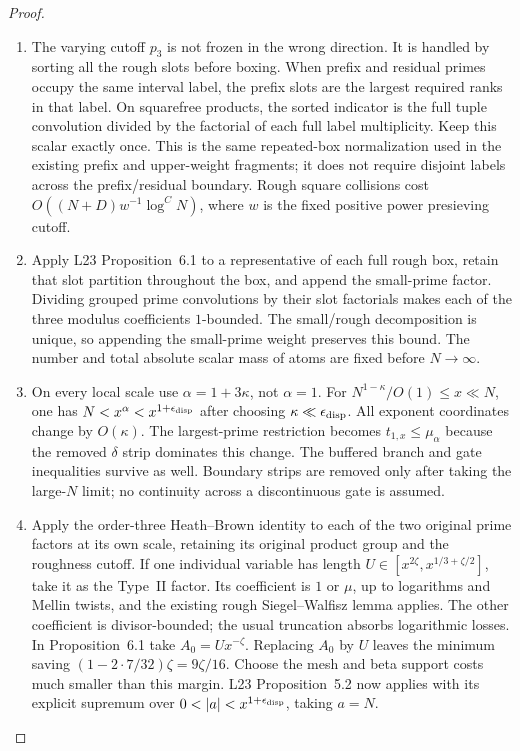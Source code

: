 \documentclass[11pt]{article}
\begin{document}
\begin{proof}
\begin{enumerate}
\item
The varying cutoff $p_3$ is not frozen in the wrong direction.
It is handled by sorting all the rough slots before boxing.
When prefix and residual primes occupy the same interval label,
the prefix slots are the largest required ranks in that label.
On squarefree products, the sorted indicator is the full tuple
convolution divided by the factorial of each full label
multiplicity. Keep this scalar exactly once. This is the same
repeated-box normalization used in the existing prefix and
upper-weight fragments; it does not require disjoint labels
across the prefix/residual boundary. Rough square collisions
cost $O((N+D)w^{-1}\log^C N)$, where $w$ is the fixed positive
power presieving cutoff.

\item
Apply L23 Proposition~6.1 to a representative of each full
rough box, retain that slot partition throughout the box, and
append the small-prime factor. Dividing grouped prime
convolutions by their slot factorials makes each of the three
modulus coefficients $1$-bounded. The small/rough decomposition
is unique, so appending the small-prime weight preserves this
bound. The number and total absolute scalar mass of atoms are
fixed before $N\to\infty$.

\item
On every local scale use $\alpha=1+3\kappa$, not $\alpha=1$.
For $N^{1-\kappa}/O(1)\le x\ll N$, one has
$N<x^\alpha<x^{1+\epsilon_{\rm disp}}$ after choosing
$\kappa\ll\epsilon_{\rm disp}$. All exponent coordinates
change by $O(\kappa)$. The largest-prime restriction becomes
$t_{1,x}\le\mu_\alpha$ because the removed $\delta$ strip
dominates this change. The buffered branch and gate inequalities
survive as well. Boundary strips are removed only after taking
the large-$N$ limit; no continuity across a discontinuous gate
is assumed.

\item
Apply the order-three Heath--Brown identity to each of the two
original prime factors at its own scale, retaining its original
product group and the roughness cutoff. If one individual
variable has length $U\in[x^{2\zeta},x^{1/3+\zeta/2}]$, take
it as the Type~II factor. Its coefficient is $1$ or $\mu$,
up to logarithms and Mellin twists, and the existing rough
Siegel--Walfisz lemma applies. The other coefficient is
divisor-bounded; the usual truncation absorbs logarithmic
losses. In Proposition~6.1 take $A_0=Ux^{-\zeta}$.
Replacing $A_0$ by $U$ leaves the minimum saving
$(1-2\cdot7/32)\zeta=9\zeta/16$.
Choose the mesh and beta support costs much smaller than this
margin. L23 Proposition~5.2 now applies with its explicit
supremum over $0<|a|<x^{1+\epsilon_{\rm disp}}$, taking $a=N$.


\end{enumerate}
\end{proof}
\end{document}
